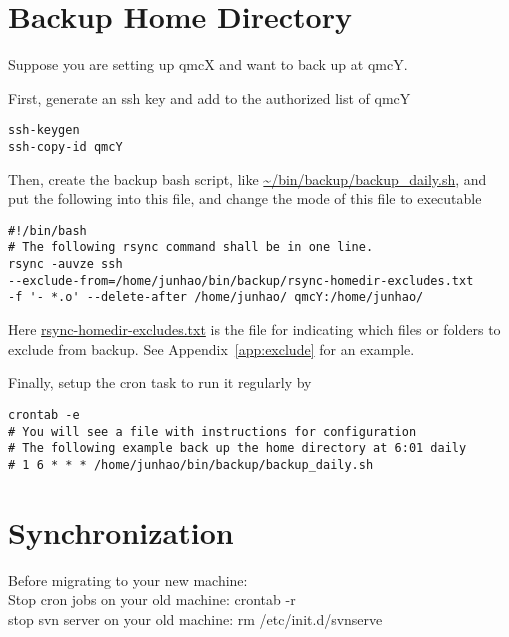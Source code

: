 \documentclass[12pt]{article}
\begin{document}
\section{Backup Home Directory}

Suppose you are setting up qmcX and want to back up at qmcY.

First, generate an ssh key and add to the authorized list of qmcY
\begin{Verbatim}
ssh-keygen
ssh-copy-id qmcY
\end{Verbatim}

Then, create the backup bash script, like \url{~/bin/backup/backup_daily.sh}, and put the following into this file, and change the mode of this file to executable
\begin{verbatim}
#!/bin/bash
# The following rsync command shall be in one line.
rsync -auvze ssh
--exclude-from=/home/junhao/bin/backup/rsync-homedir-excludes.txt
-f '- *.o' --delete-after /home/junhao/ qmcY:/home/junhao/
\end{verbatim}
Here \url{rsync-homedir-excludes.txt} is the file for indicating which files or folders to exclude from backup.
See Appendix~\ref{app:exclude} for an example.

Finally, setup the cron task to run it regularly by
\begin{Verbatim}
crontab -e
# You will see a file with instructions for configuration
# The following example back up the home directory at 6:01 daily
# 1 6 * * * /home/junhao/bin/backup/backup_daily.sh
\end{Verbatim}

\section{Synchronization}
Before migrating to your new machine:\\
Stop cron jobs on your old machine: crontab -r \\
stop svn server on your old machine: rm /etc/init.d/svnserve
\end{document}
